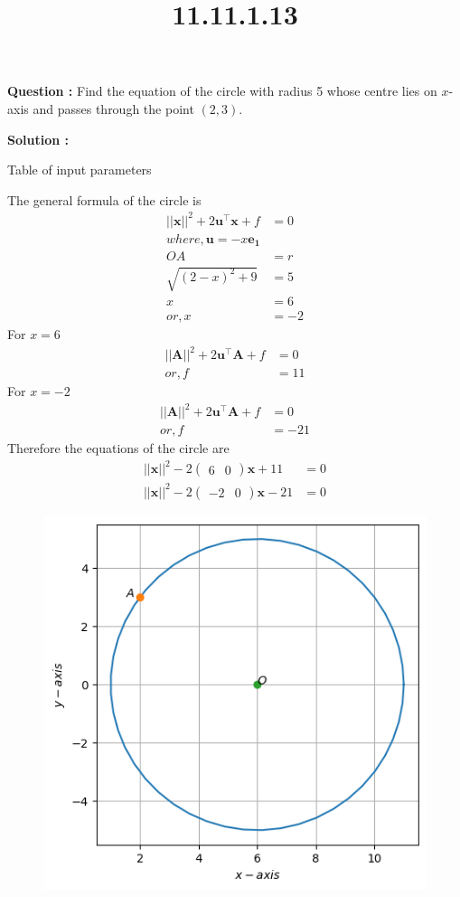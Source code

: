 \documentclass[12pt]{article}
\let\vec\mathbf
\providecommand{\brak}[1]{\ensuremath{\left(#1\right)}}
\providecommand{\myvec}[1]{\ensuremath{\begin{pmatrix}#1\end{pmatrix}}}
\providecommand{\norm}[1]{\ensuremath{\lvert|#1\rvert|}}
\let\vec\mathbf
\providecommand{\brak}[1]{\ensuremath{\left(#1\right)}}
\providecommand{\myvec}[1]{\ensuremath{\begin{pmatrix}#1\end{pmatrix}}}
\providecommand{\norm}[1]{\ensuremath{\lvert|#1\rvert|}}
\begin{document}
\title{\textbf{11.11.1.13}}
\date{}
\maketitle
\textbf{Question :} Find the equation of the circle with radius 5 whose centre lies on $x$-axis and passes through the point $\brak{2,3}$.

\textbf{Solution :}
\begin{table}[H]
    \centering
    
        \caption{Table of input parameters}
    \label{tab:11.11.1.13}
\end{table}
The general formula of the circle is
\begin{align}
\norm{\vec{x}}^2 + 2\vec{u}^{\top}\vec{x}+f&=0\\
 where,   \vec{u}=-x\vec{e_1}\\
 OA&=r\\
 \sqrt{\brak{2-x}^2+9}&=5\\
 x&=6\\
 or,x&=-2
 \end{align}
 For $x=6$
 \begin{align}
 \norm{\vec{A}}^2 + 2\vec{u}^{\top}\vec{A}+f&=0\\
 or,f&=11
\end{align}
 For $x=-2$
 \begin{align}
 \norm{\vec{A}}^2 + 2\vec{u}^{\top}\vec{A}+f&=0\\
 or,f&=-21
\end{align}
Therefore the equations of the circle are
\begin{align}
   \norm{\vec{x}}^2 - 2\myvec{6&0}\vec{x}+11&=0\\
   \norm{\vec{x}}^2 - 2\myvec{-2&0}\vec{x}-21&=0
\end{align}    
\begin{figure}[H]
    \centering
\includegraphics[width=\columnwidth]{fig/11.11.1.13.png}
    \caption{}
    \label{fig:11.11.1.13}
\end{figure}
\end{document}

